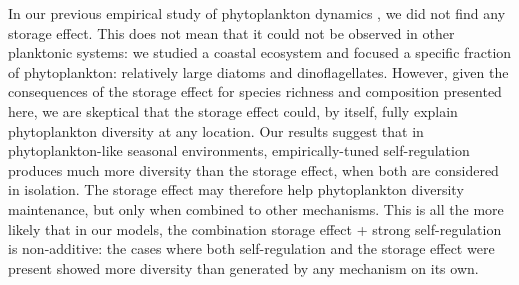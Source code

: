 \documentclass[a4paper,12pt]{article}
\begin{document}
In our previous empirical study of phytoplankton dynamics \citep{barraquand2018coastal},
we did not find any storage effect. This does not mean that it could
not be observed in other planktonic systems: we studied a coastal
ecosystem and focused a specific fraction of phytoplankton: relatively
large diatoms and dinoflagellates. However, given the consequences
of the storage effect for species richness and composition presented
here, we are skeptical that the storage effect could, by itself, fully
explain phytoplankton diversity at any location. Our results suggest
that in phytoplankton-like seasonal environments, empirically-tuned
self-regulation produces much more diversity than the storage effect,
when both are considered in isolation. The storage effect may therefore
help phytoplankton diversity maintenance, but only when combined to
other mechanisms. This is all the more likely that in our models,
the combination storage effect + strong self-regulation is non-additive:
the cases where both self-regulation and the storage effect were present
showed more diversity than generated by any mechanism on its own.
\end{document}
